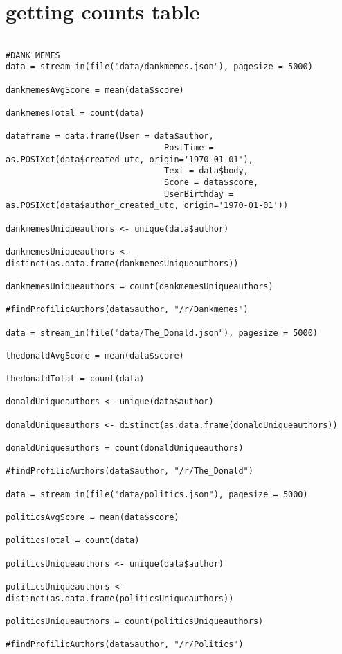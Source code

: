 \section{getting counts table}
\label{sec:Appedixtable}
\begin{lstlisting}

#DANK MEMES
data = stream_in(file("data/dankmemes.json"), pagesize = 5000)

dankmemesAvgScore = mean(data$score)

dankmemesTotal = count(data)

dataframe = data.frame(User = data$author,
                                PostTime = as.POSIXct(data$created_utc, origin='1970-01-01'),
                                Text = data$body,
                                Score = data$score,
                                UserBirthday = as.POSIXct(data$author_created_utc, origin='1970-01-01'))

dankmemesUniqueauthors <- unique(data$author)

dankmemesUniqueauthors <- distinct(as.data.frame(dankmemesUniqueauthors))

dankmemesUniqueauthors = count(dankmemesUniqueauthors)

#findProfilicAuthors(data$author, "/r/Dankmemes")

data = stream_in(file("data/The_Donald.json"), pagesize = 5000)

thedonaldAvgScore = mean(data$score)

thedonaldTotal = count(data)

donaldUniqueauthors <- unique(data$author)

donaldUniqueauthors <- distinct(as.data.frame(donaldUniqueauthors))

donaldUniqueauthors = count(donaldUniqueauthors)

#findProfilicAuthors(data$author, "/r/The_Donald")

data = stream_in(file("data/politics.json"), pagesize = 5000)

politicsAvgScore = mean(data$score)

politicsTotal = count(data)

politicsUniqueauthors <- unique(data$author)

politicsUniqueauthors <- distinct(as.data.frame(politicsUniqueauthors))

politicsUniqueauthors = count(politicsUniqueauthors)

#findProfilicAuthors(data$author, "/r/Politics")


\end{lstlisting}
